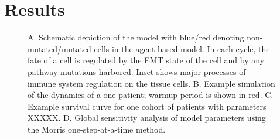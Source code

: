 \documentclass{article}
\begin{document}

\section{Results}

\begin{figure}[H]
\center
{}
\caption{A. Schematic depiction of the model with blue/red denoting non-mutated/mutated cells in the agent-based model. In each cycle, the fate of a cell is regulated by the EMT state of the cell and by any pathway mutations harbored. Inset shows major processes of immune system regulation on the tissue cells.
B. Example simulation of the dynamics of a one patient; warmup period is shown in red.
C. Example survival curve for one cohort of patients with parameters XXXXX. %
D. Global sensitivity analysis of model parameters using the Morris one-step-at-a-time method.}
\label{fig:ModelIntro}
\end{figure}
\end{document}
